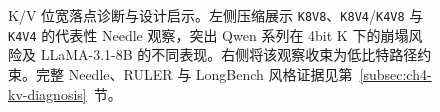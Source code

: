 \begin{figure}[!htbp]
{%
  }
  \caption{K/V 位宽落点诊断与设计启示。左侧压缩展示 \texttt{K8V8}、\texttt{K8V4}/\texttt{K4V8} 与 \texttt{K4V4} 的代表性 Needle 观察，突出 Qwen 系列在 4bit K 下的崩塌风险及 LLaMA-3.1-8B 的不同表现。右侧将该观察收束为低比特路径约束。完整 Needle、RULER 与 LongBench 风格证据见第~\ref{subsec:ch4-kv-diagnosis}~节。}
  \label{fig:ch3-kv-asymmetry}
\end{figure}
